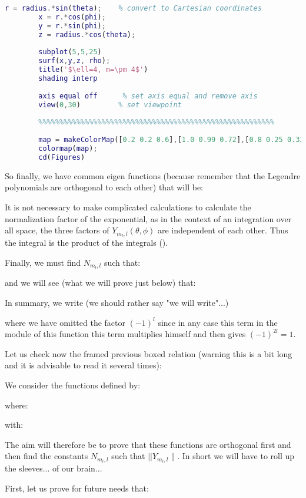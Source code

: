 \begin{lstlisting}[language=MATLAB]
		r = radius.*sin(theta);    % convert to Cartesian coordinates
		x = r.*cos(phi);
		y = r.*sin(phi);
		z = radius.*cos(theta);
		
		subplot(5,5,25)
		surf(x,y,z, rho);
		title('$\ell=4, m=\pm 4$')
		shading interp
		
		axis equal off      % set axis equal and remove axis
		view(0,30)         % set viewpoint
		
		%%%%%%%%%%%%%%%%%%%%%%%%%%%%%%%%%%%%%%%%%%%%%%%%%%%%%%%%
		
		map = makeColorMap([0.2 0.2 0.6],[1.0 0.99 0.72],[0.8 0.25 0.33],80);
		colormap(map);
		cd(Figures)
	\end{lstlisting}
	
	So finally, we have common eigen functions (because remember that the Legendre polynomials are orthogonal to each other) that will be:
	 
	\begin{tcolorbox}[title=Remark,colframe=black,arc=10pt]
	It is not necessary to make complicated calculations to calculate the normalization factor of the exponential, as in the context of an integration over all space, the three factors of $Y_{m_l,l}(\theta,\phi)$ are independent of each other. Thus the integral is the product of the integrals ().
	\end{tcolorbox}
	Finally, we must find $N_{m_l,l}$ such that:
	
	and we will see (what we will prove just below) that:
	
	In summary, we write (we should rather say "we will write"...)
	
	where we have omitted the factor $(-1)^l$ since in any case this term in the module of this function this term multiplies himself and then gives $(-1)^{2l}=1$.

Let us check now the framed previous boxed relation (warning this is a bit long and it is advisable to read it several times):

	We consider the functions defined by:
	
	where:
	
	with:
	
	The aim will therefore be to prove that these functions are orthogonal first and then find the constants $N_{m_l,l}$ such that $||Y_{m_l,l}\|$. In short we will have to roll up the sleeves... of our brain...

	First, let us prove for future needs that:
	
